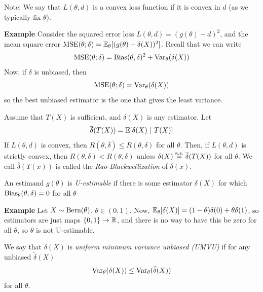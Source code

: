 Note: We say that $L(\theta, d)$ is a convex loss function if it is convex in $d$ (as we typically fix $\theta$).\\

\begin{example}{\textbf{Example}}
    Consider the squared error loss $L(\theta, d) = (g(\theta) - d)^2$, and the mean square error $\tt{MSE}(\theta; \delta) = \bb{E}_{\theta}[(g(\theta) - \delta(X))^2]$. Recall that we can write
    \[ \tt{MSE}(\theta; \delta) = \tt{Bias}(\theta, \delta)^2 + \tt{Var}_{\theta}(\delta(X)) \]
    Now, if $\delta$ is unbiased, then
    \[ \tt{MSE}(\theta; \delta) = \tt{Var}_{\theta}(\delta(X)) \]
    so the best unbiased estimator is the one that gives the least variance.
\end{example}

\begin{theorem}
    Assume that $T(X)$ is sufficient, and $\delta(X)$ is any estimator. Let 
    \[ \overline{\delta}(T(X)) = \bb{E}[\delta(X) \given T(X)] \]
    If $L(\theta, d)$ is convex, then $R(\theta, \overline{\delta}) \leq R(\theta, \delta)$ for all $\theta$. Then, if $L(\theta, d)$ is strictly convex, then $R(\theta, \delta) < R(\theta, \delta)$ unless $\delta(X) \overset{\tt{a.s.}}{=} \overline{\delta}(T(X))$ for all $\theta$. We call $\overline{\delta}(T(x))$ is called the \emph{Rao-Blackwellization} of $\delta(x)$. 
\end{theorem}

\begin{definition}
    An estimand $g(\theta)$ is \emph{U-estimable} if there is some estimator $\delta(X)$ for which $\tt{Bias}_{\theta}(\theta, \delta) = 0$ for all $\theta$
\end{definition}

\begin{example}{\textbf{Example}}
    Let $X \sim \Bern(\theta)$, $\theta \in (0, 1)$. Now, $\bb{E}_{\theta}[\delta(X)] = (1 - \theta)\delta(0) + \theta \delta(1)$, so estimators are just maps $\{0, 1\} \to \R$, and there is no way to have this be zero for all $\theta$, so $\theta$ is not U-estimable. 
\end{example}

\begin{definition}
    We say that $\delta(X)$ is \emph{uniform minimum variance unbiased (UMVU)} if for any unbiased $\tilde{\delta}(X)$
    \[ \Var_{\theta}(\delta(X)) \leq \Var_{\theta}(\tilde{\delta}(X)) \]
    for all $\theta$.
\end{definition}


